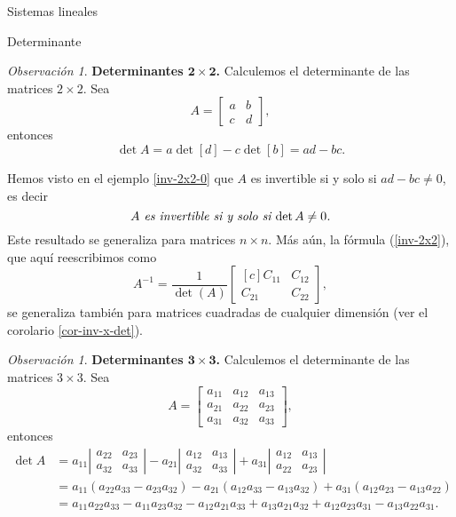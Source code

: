 \documentclass[a4paper,12pt,twoside,spanish,reqno]{amsbook}
\theoremstyle{definition}
\theoremstyle{remark}
\newtheorem{observacion}{Observaci\'on}[section]
\newtheorem{obs}{Observaci\'on}[section]
\newcommand{\C}{\mathbb C}
\begin{document}
\begin{chapter}{Sistemas lineales}
\begin{section}{Determinante}
    \begin{obs}\textbf{Determinantes $\mathbf{2 \times 2}$.} Calculemos el determinante de las matrices $2 \times 2$. Sea 
        $$A=\begin{bmatrix}a&b\\c&d\end{bmatrix},$$  entonces
        $$
        \det A = a \det [d] - c \det [b] = ad-bc.
        $$
        
        Hemos visto en el ejemplo \ref{inv-2x2-0} que $A$ es invertible si y solo si $ ad-bc \not=0$,  es decir 
        \begin{equation}
        \text{\textit{$A$ es invertible si y solo si $ \det A \not=0$.}}
        \end{equation}
        Este resultado se generaliza para matrices $n \times n$. Más aún, la fórmula (\ref{inv-2x2}),  que aquí reescribimos como
        \begin{equation*}
            A^{-1} = \dfrac{1}{\det(A)}
            \begin{bmatrix*}[c]C_{11}&C_{12}\\C_{21}&C_{22}\end{bmatrix*},
        \end{equation*} se generaliza también para matrices cuadradas de cualquier dimensión (ver el corolario \ref{cor-inv-x-det}).
    \end{obs}
    
    
    \begin{observacion} \textbf{Determinantes $\mathbf{3 \times 3}$.} Calculemos el determinante de las matrices $3 \times 3$. Sea 
        $$A=\begin{bmatrix}a_{11}&a_{12}&a_{13}\\a_{21}&a_{22}&a_{23}\\a_{31}&a_{32}&a_{33}\end{bmatrix},$$  entonces
        \begin{align*}
        \det A &= a_{11}\left|\begin{matrix}a_{22}&a_{23}\\a_{32}&a_{33}\end{matrix}\right|
        - a_{21}\left|\begin{matrix}a_{12}&a_{13}\\a_{32}&a_{33}\end{matrix}\right|
        + a_{31}\left|\begin{matrix}a_{12}&a_{13}\\a_{22}&a_{23}\end{matrix}\right|\\
        &= a_{11}(a_{22}a_{33}- a_{23}a_{32})
        - a_{21}(a_{12}a_{33}-a_{13}a_{32}) 
        + a_{31}(a_{12}a_{23} - a_{13}a_{22}) \\
        &=a_{11}a_{22}a_{33}- a_{11}a_{23}a_{32} 
        - a_{12}a_{21}a_{33}+ a_{13}a_{21}a_{32}+ a_{12}a_{23}a_{31}
        - a_{13}a_{22}a_{31}.	
        \end{align*}
        

\end{observacion}
\end{section}
\end{chapter}
\end{document}
